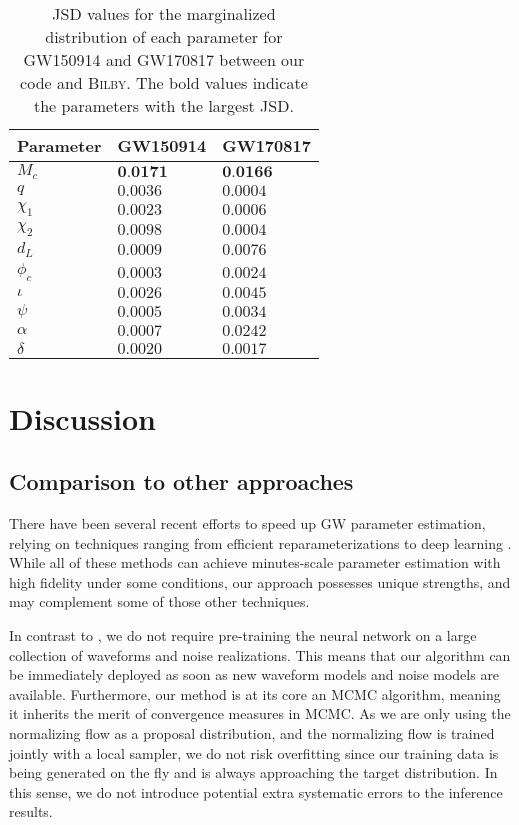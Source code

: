 \documentclass[twocolumn]{aastex631}
\begin{document}
\begin{table}[hbt!]
    \begin{center}
    \begin{tabular}{ l l l}
    \hline
    \hline
    Parameter & GW150914 & GW170817\\
    \hline
        $M_c$ & $\textbf{0.0171}$ & $\textbf{0.0166}$ \\
        $q$ & $0.0036$ & $0.0004$ \\
        $\chi_1$ & $0.0023$ & $0.0006$ \\
        $\chi_2$ & $0.0098$ & $0.0004$ \\
        $d_L$ & $0.0009$ & $0.0076$ \\
        $\phi_c$ & $0.0003$ & $0.0024$ \\
        $\iota$ & $0.0026$ & $0.0045$ \\
        $\psi$ & $0.0005$ & $0.0034$ \\
        $\alpha$ & $0.0007$ & $0.0242$ \\
        $\delta$ & $0.0020$ & $0.0017$ \\
    \hline
    \hline
    \end{tabular}
    \caption{JSD values for the marginalized distribution of each parameter for
    GW150914 and GW170817 between our code and \textsc{Bilby}. The bold values
    indicate the parameters with the largest JSD.}
    \label{tab:JSD}
    \end{center}
\end{table}

\section{Discussion}
\label{sec: Discussion}

\subsection{Comparison to other approaches}

There have been several recent efforts to speed up GW parameter estimation,
relying on techniques ranging from efficient reparameterizations
\cite{Islam:2022afg,Roulet:2022kot} to deep learning
\cite{Dax:2021tsq,Dax:2022pxd}. While all of these methods can achieve
minutes-scale parameter estimation with high fidelity under some conditions,
our approach possesses unique strengths, and may complement some of those other
techniques.

In contrast to \cite{Dax:2021tsq,Dax:2022pxd}, we do not require pre-training
the neural network on a large collection of waveforms and noise realizations.
This means that our algorithm can be immediately deployed as soon as new
waveform models and noise models are available. Furthermore, our method is at
its core an MCMC algorithm, meaning it inherits the merit of convergence
measures in MCMC. As we are only using the normalizing flow as a proposal
distribution, and the normalizing flow is trained jointly with a local sampler,
we do not risk overfitting since our training data is being generated on the
fly and is always approaching the target distribution. In this sense, we do not
introduce potential extra systematic errors to the inference results.
\end{document}
